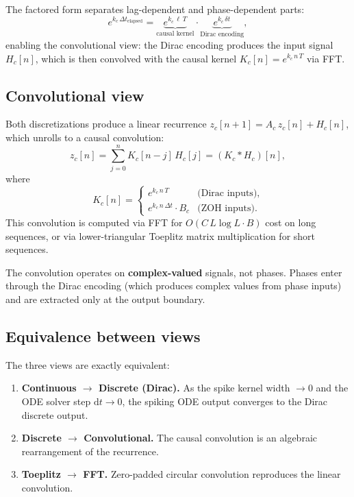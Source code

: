 \documentclass[11pt]{article}
\newcommand{\dd}{\mathrm{d}}
\newcommand{\dt}{\Delta t}
\theoremstyle{definition}
\begin{document}
The factored form separates lag-dependent and phase-dependent parts:
\begin{equation}
  e^{k_c\,\Delta t_{\text{elapsed}}}
    = \underbrace{e^{k_c\,\ell\,T}}_{\text{causal kernel}}
    \cdot \underbrace{e^{k_c\,\delta t}}_{\text{Dirac encoding}},
\end{equation}
enabling the convolutional view: the Dirac encoding produces the input
signal~$H_c[n]$, which is then convolved with the causal kernel
$K_c[n] = e^{k_c\,n\,T}$ via FFT.

\subsection{Convolutional view}

Both discretizations produce a linear recurrence
$z_c[n+1] = A_c\,z_c[n] + H_c[n]$, which unrolls to a causal
convolution:
\begin{equation}\label{eq:causal-conv}
  z_c[n] = \sum_{j=0}^{n} K_c[n-j]\,H_c[j]
         = (K_c * H_c)[n],
\end{equation}
where
\[
  K_c[n] =
  \begin{cases}
    e^{k_c\,n\,T} & \text{(Dirac inputs)},\\
    e^{k_c\,n\,\dt}\cdot B_c & \text{(ZOH inputs)}.
  \end{cases}
\]
This convolution is computed via FFT for $O(C\,L\log L\cdot B)$ cost
on long sequences, or via lower-triangular Toeplitz matrix multiplication
for short sequences.

The convolution operates on \textbf{complex-valued} signals, not phases.
Phases enter through the Dirac encoding (which produces complex values
from phase inputs) and are extracted only at the output boundary.

\subsection{Equivalence between views}

The three views are exactly equivalent:
\begin{enumerate}[nosep]
  \item \textbf{Continuous $\to$ Discrete (Dirac).} As the spike kernel
    width $\to 0$ and the ODE solver step $\dd t \to 0$, the spiking ODE
    output converges to the Dirac discrete output.
  \item \textbf{Discrete $\to$ Convolutional.} The causal convolution is
    an algebraic rearrangement of the recurrence.
  \item \textbf{Toeplitz $\to$ FFT.} Zero-padded circular convolution
    reproduces the linear convolution.
\end{enumerate}
\end{document}
